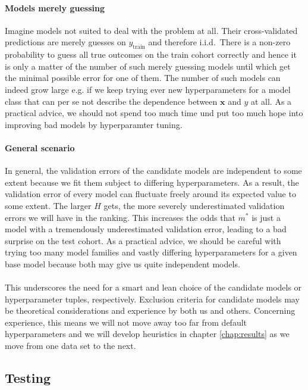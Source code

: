 \paragraph{Models merely guessing}
Imagine models not suited to deal with the problem at all. Their cross-validated predictions are 
merely guesses on $y_\text{train}$ and therefore i.i.d.\ There is a non-zero probability to guess
all true outcomes on the train cohort correctly and hence it is only a matter of the number of 
such merely guessing models until which get the minimal possible error for one of them. The number of 
such models can indeed grow large e.g. if we keep trying ever new hyperparameters for a model class 
that can per se not describe the dependence between $\mathbf{x}$ and $y$ at all.
As a practical advice, we should not spend too much time und put too much hope into improving 
bad models by hyperparamter tuning.

\paragraph{General scenario}
In general, the validation errors of the candidate models are independent to some extent because we fit them
subject to differing hyperparameters. As a result, the validation error of every model can 
fluctuate freely around its expected value to some extent. The larger $H$ gets, the 
more severely underestimated validation errors we will have in the ranking. This 
increases the odds that $m^*$ is just a model with a tremendously underestimated validation error, 
leading to a bad surprise on the test cohort. As a practical advice, we should be careful with 
trying too many model families and vastly differing hyperparameters for a given base model 
because both may give us quite independent models.

\paragraph{}
This underscores the need for a smart and lean choice of the candidate models or hyperparameter 
tuples, respectively. Exclusion criteria for candidate models may be theoretical considerations
and experience by both us and others. Concerning experience, this means we will not move away too 
far from default hyperparameters and we will develop heuristics in chapter \ref{chap:results} as 
we move from one data set to the next.

\subsection{Testing}

